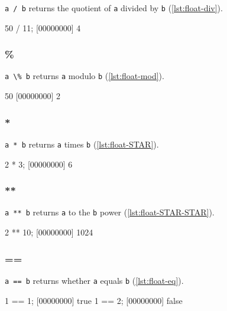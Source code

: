 \lstinline|a / b| returns the quotient of \lstinline|a| divided by
\lstinline|b| (\autoref{lst:float-div}).

\begin{urbiscript}[caption=Float.'/', label=lst:float-div, float=\floatposh]
50 / 11;
[00000000] 4
\end{urbiscript}

\subsubsection{\%}

\lstinline|a \% b| returns \lstinline|a| modulo \lstinline|b| (\autoref{lst:float-mod}).

\begin{urbiscript}[caption=Float.'\%', label=lst:float-mod, float=\floatposh]
50 %
[00000000] 2
\end{urbiscript}

\subsubsection{*}

\lstinline|a * b| returns \lstinline|a| times \lstinline|b| (\autoref{lst:float-STAR}).

\begin{urbiscript}[caption=Float.'*', label=lst:float-STAR, float=\floatposh]
2 * 3;
[00000000] 6
\end{urbiscript}

\subsubsection{**}

\lstinline|a ** b| returns \lstinline|a| to the \lstinline|b| power (\autoref{lst:float-STAR-STAR}).

\begin{urbiscript}[caption=Float.'**', label=lst:float-STAR-STAR, float=\floatposh]
2 ** 10;
[00000000] 1024
\end{urbiscript}

\subsubsection{==}

\lstinline|a == b| returns whether \lstinline|a| equals \lstinline|b| (\autoref{lst:float-eq}).

\begin{urbiscript}[caption={Float.'=='}, label=lst:float-eq, float=\floatposh]
1 == 1;
[00000000] true
1 == 2;
[00000000] false
\end{urbiscript}
